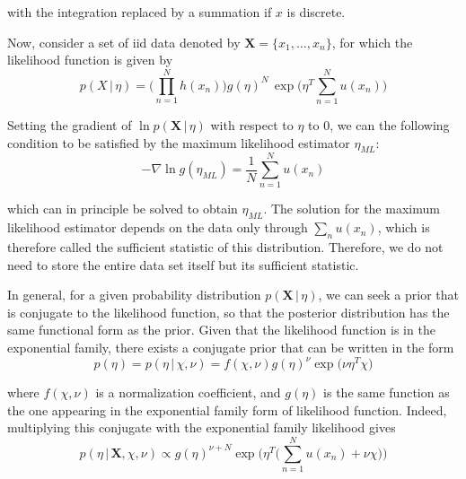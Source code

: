   with the integration replaced by a summation if $x$ is discrete.

  Now, consider a set of iid data denoted by $\mathbf{X} = \{x_1, \ldots, x_n\}$, for which the likelihood function is given by
  \begin{equation}
    p(X\,|\,\eta) = \bigg( \prod_{n=1}^N h(x_n) \bigg) g(\eta)^N\, \exp \bigg( \eta^T \sum_{n=1}^N u(x_n) \bigg)
  \end{equation}

  Setting the gradient of $\ln p(\mathbf{X}\,|\, \eta)$ with respect to $\eta$ to $0$, we can the following condition to be satisfied by the maximum likelihood estimator $\eta_{ML}$:
  \begin{equation}
    -\nabla \ln g(\eta_{ML}) = \frac{1}{N} \sum_{n=1}^N u(x_n)
  \end{equation}

  which can in principle be solved to obtain $\eta_{ML}$. The solution for the maximum likelihood estimator depends on the data only through $\sum_n u(x_n)$, which is therefore called the sufficient statistic of this distribution. Therefore, we do not need to store the entire data set itself but its sufficient statistic.

  In general, for a given probability distribution $p(\mathbf{X}\,|\, \eta)$, we can seek a prior that is conjugate to the likelihood function, so that the posterior distribution has the same functional form as the prior. Given that the likelihood function is in the exponential family, there exists a conjugate prior that can be written in the form
  \begin{equation}
    p(\eta) = p(\eta\,|\, \chi, \nu) = f(\chi, \nu) g(\eta)^\nu \exp \big( \nu \eta^T \chi \big)
  \end{equation}

  where $f(\chi, \nu)$ is a normalization coefficient, and $g(\eta)$ is the same function as the one appearing in the exponential family form of likelihood function. Indeed, multiplying this conjugate with the exponential family likelihood gives
  \begin{equation}
    p(\eta\,|\, \mathbf{X}, \chi, \nu) \propto g(\eta)^{\nu + N} \exp \Bigg( \eta^T \bigg( \sum_{n=1}^N u(x_n) + \nu \chi \bigg) \Bigg)
  \end{equation}


